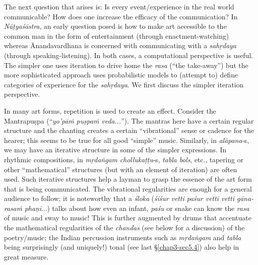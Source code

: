 The next question that arises is: Is every event/experience in the real world communicable? How does one increase the efficacy of the communication? In \textsl{Nāṭyaśāstra}, an early question posed is how to make art accessible to the common man in the form of entertainment (through enactment-watching) whereas Ānandavardhana is concerned with communicating with a \textsl{sahṛdaya} (through speaking-listening). In both cases, a computational perspective is useful. The simpler one uses iteration to drive home the \textsl{rasa} (“the take-away”) but the more sophisticated approach uses probabilistic models to (attempt to) define categories of experience for the \textsl{sahṛdaya}. We first discuss the simpler iteration perspective. 

In many art forms, repetition is used to create an effect. Consider the Mantrapuṣpa (“\textsl{yo’pāṁ puṣpaṁ veda...}”). The mantras here have a certain regular structure and the chanting creates a certain “vibrational” sense or cadence for the hearer; this seems to be true for all good “simple” music. Similarly, in \textsl{alāpana}-s, we may have an iterative structure in some of the simpler expressions. In rhythmic compositions, in \textsl{mṛdaṅgam chollukaṭṭu}-s, \textsl{tabla bols}, etc., tapering or other “mathematical” structures (but with an element of iteration) are often used. Such iterative structures help a layman to grasp the essence of the art form that is being communicated. The vibrational regularities are enough for a general audience to follow; it is noteworthy that a \textsl{śloka} (\textsl{śiśur vetti paśur vetti vetti gāna-rasaṁ phaṇī}...) talks about how even an infant, \textsl{paśu} or snake can know the \textsl{rasa} of music and sway to music! This is further augmented by drums that accentuate the mathematical regularities of the \textsl{chandas} (see below for a discussion) of the poetry/music; the Indian percussion instruments such as \textsl{mṛdaṅgam} and \textsl{tabla} being surprisingly (and uniquely!) tonal (see last \S\ref{chap3-sec5.4}) also help in great measure. 

